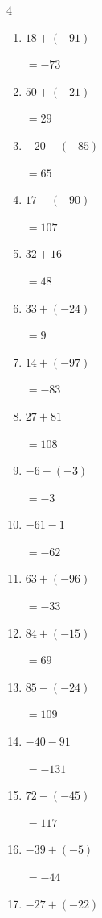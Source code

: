 \begin{multicols}{4}
\begin{enumerate}
        $=-7$

  \item $18+(-91)$

        $=-73$

  \item $50+(-21)$

        $=29$

  \item $-20-(-85)$

        $=65$

  \item $17-(-90)$

        $=107$

  \item $32+16$

        $=48$

  \item $33+(-24)$

        $=9$

  \item $14+(-97)$

        $=-83$

  \item $27+81$

        $=108$

  \item $-6-(-3)$

        $=-3$

  \item $-61-1$

        $=-62$

  \item $63+(-96)$

        $=-33$

  \item $84+(-15)$

        $=69$

  \item $85-(-24)$

        $=109$

  \item $-40-91$

        $=-131$

  \item $72-(-45)$

        $=117$

  \item $-39+(-5)$

        $=-44$

  \item $-27+(-22)$


\end{enumerate}
\end{multicols}
